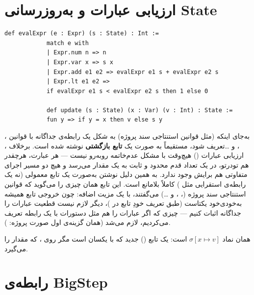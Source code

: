 \documentclass[12pt]{report}
\begin{document}
	\section{ارزیابی عبارات و به‌روزرسانی State}
	
	\begin{latin}
		\begin{lstlisting}[style=leanstyle]
			def evalExpr (e : Expr) (s : State) : Int :=
			match e with
			| Expr.num n => n
			| Expr.var x => s x
			| Expr.add e1 e2 => evalExpr e1 s + evalExpr e2 s
			| Expr.lt e1 e2 =>
			if evalExpr e1 s < evalExpr e2 s then 1 else 0
			
			def update (s : State) (x : Var) (v : Int) : State :=
			fun y => if y = x then v else s y
		\end{lstlisting}
	\end{latin}
	
	 به‌جای اینکه (مثل قوانین استنتاجی سند پروژه) به شکل یک رابطه‌ی جداگانه با قوانین ، ،  و \ldots تعریف شود، مستقیماً به صورت یک \textbf{تابع بازگشتی} نوشته شده است. برخلاف ، ارزیابی عبارات () هیچ‌وقت با مشکل عدم‌خاتمه روبه‌رو نیست — هر عبارت، هرچقدر هم تودرتو، در یک تعداد قدم محدود و ثابت به یک مقدار می‌رسد و هیچ دو مسیر اجرای متفاوتی هم برایش وجود ندارد. به همین دلیل نوشتن  به‌صورت یک تابع معمولی (نه یک رابطه‌ی استقرایی مثل ) کاملاً بلامانع است. این تابع همان چیزی را می‌گوید که قوانین استنتاجی سند پروژه (، ،  و \ldots) می‌گفتند، با یک مزیت اضافه: چون خروجی تابع همیشه به‌خودی‌خود یکتاست (طبق تعریف خودِ تابع در )، دیگر لازم نیست قطعیت عبارات را جداگانه اثبات کنیم — چیزی که اگر عبارات را هم مثل دستورات با یک رابطه تعریف می‌کردیم، لازم می‌شد (همان گزینه‌ی اول صورت پروژه: ).
	
	 همان نماد $\sigma[x \mapsto v]$ است: یک تابع () جدید که با  یکسان است مگر روی ، که مقدار  را می‌گیرد.
	
	\section{رابطه‌ی BigStep}
	
\end{document}
